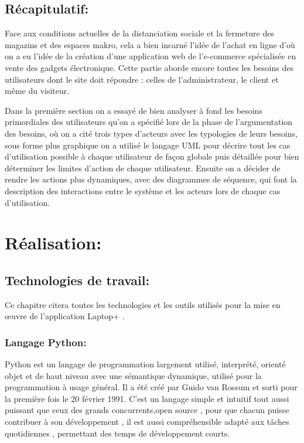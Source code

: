 \documentclass[a4paper]{report}
\begin{document}
\begin{doublespace}
\begin{itemize}
    \end{itemize}

    \newpage
    \section{Récapitulatif:}
    Face aux conditions actuelles de la distanciation sociale
    et la fermeture des magazins et des espaces makro, cela a bien incarné l'idée
    de l'achat en ligne d'où on a eu l'idée de la création d’une application web de
    l'e-commerce spécialisée en vente des gadgets électronique. Cette partie aborde
    encore toutes les besoins des utilisateurs dont le site doit répondre : celles
    de l’administrateur, le client	et même du visiteur.

    Dans la première section on a essayé de bien analyser à
    fond les besoins primordiales des utilisateurs qu'on a spécifié lors de la
    phase de l'argumentation des besoins, où on a cité trois types d'acteurs avec
    les typologies de leurs besoins, sous forme plus graphique on a utilisé le
    langage UML pour décrire tout les cas d'utilisation possible à chaque
    utilisateur de façon globale puis  détaillée pour bien déterminer les limites
    d'action de chaque utilisateur.
    Ensuite on a décider de rendre les actions plus dynamiques,
    avec des diagrammes de séquence, qui font la description des interactions entre
    le système et les acteurs lors de chaque cas d'utilisation.

    \chapter{Réalisation:}
    \fancyhead[L]{\hspace*{5cm}}


    \section{Technologies de travail:}
    Ce chapitre citera toutes les technologies et les
    outils utilisés pour la mise en œuvre de l'application Laptop+ .
    \subsection{Langage Python:}
    \begin{figure}[H]
        \raggedleft{
        }
    \end{figure}
    Python est un langage de programmation largement
    utilisé, interprété, orienté objet et de haut niveau avec une sémantique
    dynamique, utilisé pour la programmation à usage général. Il a été créé par
    Guido van Rossum et sorti pour la première fois le 20 février 1991. C'est un
    langage simple et intuitif tout aussi puissant que ceux des grands
    concurrents,open source , pour que chacun puisse contribuer à son développement
    , il est aussi compréhensible
    adapté aux tâches quotidiennes , permettant des temps
    de développement courts.


\end{doublespace}
\end{document}
